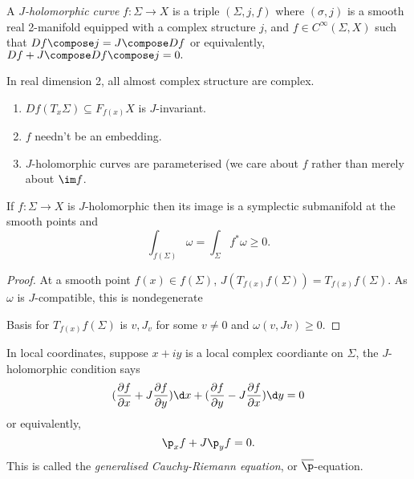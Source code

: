 \documentclass[a4paper]{article}
\begin{document}
\begin{definition}
  A \emph{\(J\)-holomorphic curve} \(f: \Sigma \to X\) is a triple \((\Sigma, j, f)\) where \((\sigma, j)\) is a smooth real 2-manifold equipped with a complex structure \(j\), and \(f \in C^\infty(\Sigma, X)\) such that \(Df \compose j = J \compose Df\) or equivalently, \(Df + J \compose Df \compose j = 0.\)
\end{definition}

\begin{remark}
  In real dimension 2, all almost complex structure are complex.
\end{remark}

\begin{remark}\leavevmode
  \begin{enumerate}
  \item \(Df(T_x \Sigma) \subseteq F_{f(x)}X\) is \(J\)-invariant.
  \item \(f\) needn't be an embedding.
  \item \(J\)-holomorphic curves are parameterised (we care about \(f\) rather than merely about \(\im f\).
  \end{enumerate}
\end{remark}

\begin{lemma}
  If \(f: \Sigma \to X\) is \(J\)-holomorphic then its image is a symplectic submanifold at the smooth points and
  \[
    \int_{f(\Sigma)} \omega = \int_\Sigma f^*\omega \geq 0.
  \]
\end{lemma}

\begin{proof}
  At a smooth point \(f(x) \in f(\Sigma)\), \(J(T_{f(x)}f(\Sigma)) = T_{f(x)}f(\Sigma)\). As \(\omega\) is \(J\)-compatible, this is nondegenerate

  Basis for \(T_{f(x)}f(\Sigma)\) is \(v, J_v\) for some \(v \ne 0\) and \(\omega(v, Jv) \geq 0\).
\end{proof}

In local coordinates, suppose \(x + iy\) is a local complex coordiante on \(\Sigma\), the \(J\)-holomorphic condition says
\[
  (\frac{\partial f}{\partial x} + J \frac{\partial f}{\partial y}) \d x + (\frac{\partial f}{\partial y} - J \frac{\partial f}{\partial x}) \d y = 0
\]
or equivalently,
\[
  \p_x f + J \p_y f = 0.
\]
This is called the \emph{generalised Cauchy-Riemann equation}, or \(\overline \p\)-equation.
\end{document}
